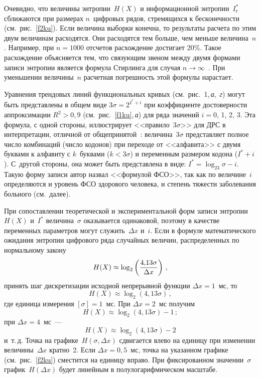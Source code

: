 \begin{multicols}{2}
  Очевидно, что величины энтропии~$H(X)$ и информационной 
энтропии~$I^*_{\mathrm{г}}$ сближаются при размерах $n$~цифровых рядов, 
стремящихся к бесконечности (см.\ рис.~\ref{f2ku}). Если величина выборки 
конечна, то результаты расчета по этим двум величинам расходятся. Они 
расходятся тем больше, чем меньше величина~$n$. Например, при $n = 1000$ 
отсчетов расхождение достигает 20\%. Такое расхождение объясняется тем, что 
связующим звеном между двумя формами записи энтропии является формула 
Стирлинга для случая $n\rightarrow \infty$~\cite{6ku, 29ku}. При уменьшении 
величины~$n$ расчетная погрешность этой формулы нарастает.
  
  Уравнения трендовых линий функциональных кривых (см.\ рис.~1,\,\textit{а},~\textit{г}) могут 
быть представлены в общем виде $3\sigma = 2^{I^*+i}$ при коэффициенте 
достоверности аппроксимации $R^2> 0{,}9$ (см.\ рис.~\ref{f1ku},\,\textit{а}) для 
ряда значений $i = 0$, 1, 2, 3. Эта формула, с одной стороны, иллюстрирует 
<<правило~$3\sigma$>> для ДРС в интерпретации, отличной от 
общепринятой~\cite{15ku, 23ku}: величина~$3\sigma$ представляет полное 
число комбинаций (число кодонов) при переходе от <<алфавита>> с двумя 
буквами к алфавиту с $k$~буквами ($k < 3\sigma$) и переменным размером 
кодона ($I^*+ i$). С~другой стороны, она может быть представлена в виде: $I^* 
= \log_23\sigma -i$. Такую форму записи автор назвал <<формулой ФСО>>, так 
как по величине~$i$ определяются и уровень ФСО здорового человека, и 
степень тяжести заболевания больного (см.\ далее). 
  
  При сопоставлении теоретической и экспериментальной форм записи 
энтропии~$H(X)$ и~$I^*$ величина~$\sigma$ оказывается одинаковой, 
поэтому в качестве переменных параметров могут служить~$\Delta x$ и~$i$. 
Если в формуле математического ожидания энтропии цифрового ряда 
случайных величин, распределенных по нормальному закону 
\begin{equation}
H(X) \approx  \log_2\left(\displaystyle\frac{\displaystyle 4{,}13\sigma\mathstrut}{\displaystyle \Delta x\mathstrut}\right)\,,
\label{aa}
\end{equation}
принять шаг дискретизации исходной непрерывной 
функции $\Delta x = 1$~мс, то 
$$H(X) \approx \log_2(4{,}13\sigma)\,,
$$ 
где единица 
измерения $[\sigma ] = 1$~мс. При $\Delta x = 2$~мс получим 
$$
H(X) \approx  \log_2(4{,}13\sigma) - 1\,;$$
при $\Delta x = 4$~мс~--- 
$$H(X) \approx  \log_2(4{,}13\sigma)- 2$$ 
и~т.\,д. Точка на графике~$H(\sigma, \Delta x)$ 
сдвигается влево на единицу при изменении величины~$\Delta x$ кратно~2. 
Если $\Delta x = 0{,}5$~мс, точка на указанном графике (см.\ рис.~\ref{f2ku}) 
сместится на единицу вправо. При фиксированном значении~$\sigma$ 
график~$H(\Delta x)$ будет линейным в полулогарифмическом масштабе. 
  

\end{multicols}
